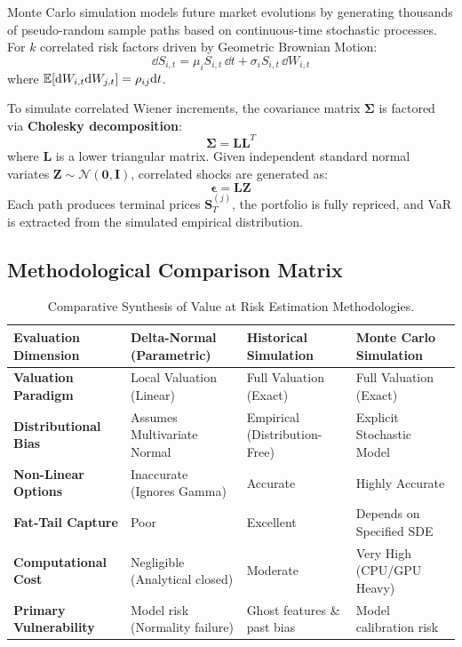 Monte Carlo simulation models future market evolutions by generating thousands of pseudo-random sample paths based on continuous-time stochastic processes. For $k$ correlated risk factors driven by Geometric Brownian Motion:
\begin{equation}
\dd S_{i,t} = \mu_i S_{i,t} \, \dd t + \sigma_i S_{i,t} \, \dd W_{i,t}
\end{equation}
where $\mathbb{E}[\mathrm{d} W_{i,t} \mathrm{d} W_{j,t}] = \rho_{ij} \mathrm{d} t$.

To simulate correlated Wiener increments, the covariance matrix $\boldsymbol{\Sigma}$ is factored via \textbf{Cholesky decomposition}:
\begin{equation}
\boldsymbol{\Sigma} = \mathbf{L} \mathbf{L}^T
\end{equation}
where $\mathbf{L}$ is a lower triangular matrix. Given independent standard normal variates $\mathbf{Z} \sim \mathcal{N}(\mathbf{0}, \mathbf{I})$, correlated shocks are generated as:
\begin{equation}
\boldsymbol{\epsilon} = \mathbf{L} \mathbf{Z}
\end{equation}
Each path produces terminal prices $\mathbf{S}_T^{(j)}$, the portfolio is fully repriced, and VaR is extracted from the simulated empirical distribution.

\subsection{Methodological Comparison Matrix}

\begin{table}[htbp]
\centering
\small
\begin{tabularx}{\textwidth}{lXXX}
\toprule
\textbf{Evaluation Dimension} & \textbf{Delta-Normal (Parametric)} & \textbf{Historical Simulation} & \textbf{Monte Carlo Simulation} \\
\midrule
\textbf{Valuation Paradigm}   & Local Valuation (Linear)          & Full Valuation (Exact)         & Full Valuation (Exact) \\
\textbf{Distributional Bias}  & Assumes Multivariate Normal       & Empirical (Distribution-Free)  & Explicit Stochastic Model \\
\textbf{Non-Linear Options}   & Inaccurate (Ignores Gamma)        & Accurate                       & Highly Accurate \\
\textbf{Fat-Tail Capture}     & Poor                              & Excellent                      & Depends on Specified SDE \\
\textbf{Computational Cost}   & Negligible (Analytical closed)    & Moderate                       & Very High (CPU/GPU Heavy) \\
\textbf{Primary Vulnerability}& Model risk (Normality failure)    & Ghost features \& past bias    & Model calibration risk \\
\bottomrule
\end{tabularx}
\caption{Comparative Synthesis of Value at Risk Estimation Methodologies.}
\label{tab:var_method_comparison}
\end{table}

